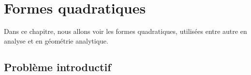 %	
%	
%	
%	
%	
%	
%	

\chapter{Formes quadratiques}

Dans ce chapitre, nous allons voir les formes quadratiques, utilisées entre autre en analyse et en géométrie analytique.

\section{Problème introductif}

